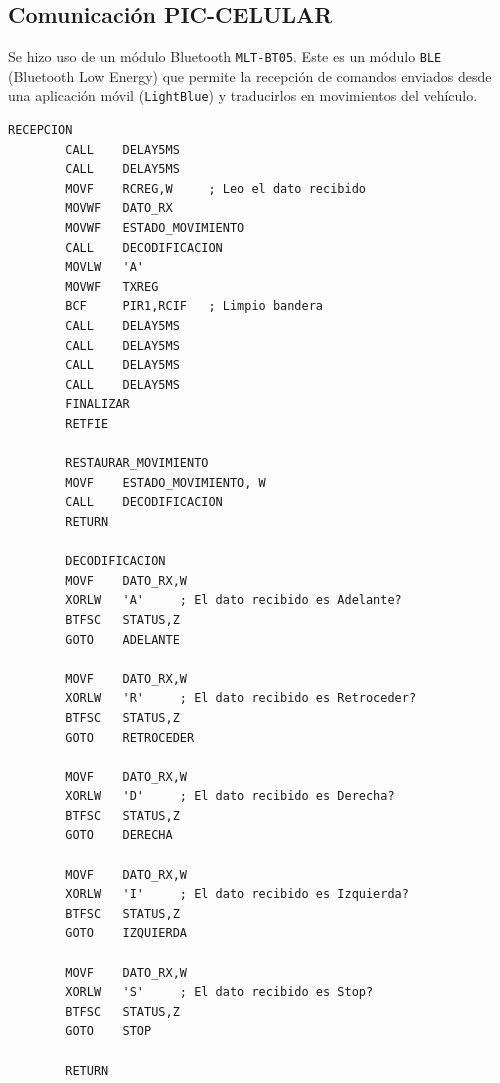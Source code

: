 \documentclass[]{article}
\begin{document}
	\subsection{Comunicación PIC-CELULAR}
	Se hizo uso de un módulo Bluetooth \texttt{MLT-BT05}. Este es un módulo \texttt{BLE} (Bluetooth Low Energy) que permite la recepción de comandos enviados desde una aplicación móvil (\texttt{LightBlue}) y traducirlos en movimientos del vehículo.
	\begin{lstlisting}[caption={Rutina de recepción y decodificación}, label={lst:bluetooth}]
		RECEPCION
		CALL    DELAY5MS
		CALL    DELAY5MS
		MOVF    RCREG,W		; Leo el dato recibido
		MOVWF   DATO_RX
		MOVWF   ESTADO_MOVIMIENTO
		CALL    DECODIFICACION
		MOVLW   'A'
		MOVWF   TXREG
		BCF	    PIR1,RCIF	; Limpio bandera
		CALL    DELAY5MS
		CALL    DELAY5MS
		CALL    DELAY5MS
		CALL    DELAY5MS
		FINALIZAR
		RETFIE
		
		RESTAURAR_MOVIMIENTO
		MOVF    ESTADO_MOVIMIENTO, W
		CALL    DECODIFICACION
		RETURN
		
		DECODIFICACION
		MOVF    DATO_RX,W
		XORLW   'A'	    ; El dato recibido es Adelante?
		BTFSC   STATUS,Z
		GOTO    ADELANTE
		
		MOVF    DATO_RX,W
		XORLW   'R'	    ; El dato recibido es Retroceder?
		BTFSC   STATUS,Z
		GOTO    RETROCEDER
		
		MOVF    DATO_RX,W
		XORLW   'D'	    ; El dato recibido es Derecha?
		BTFSC   STATUS,Z
		GOTO    DERECHA
		
		MOVF    DATO_RX,W
		XORLW   'I'	    ; El dato recibido es Izquierda?
		BTFSC   STATUS,Z
		GOTO    IZQUIERDA
		
		MOVF    DATO_RX,W
		XORLW   'S'	    ; El dato recibido es Stop?
		BTFSC   STATUS,Z
		GOTO    STOP
		
		RETURN
	\end{lstlisting}
	\newpage
	\thispagestyle{fancy}
\end{document}

